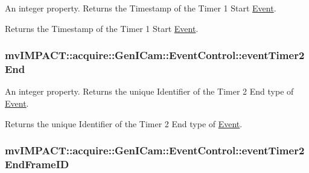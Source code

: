 An integer property. Returns the Timestamp of the Timer 1 Start \hyperlink{classmv_i_m_p_a_c_t_1_1acquire_1_1_event}{Event}. 

Returns the Timestamp of the Timer 1 Start \hyperlink{classmv_i_m_p_a_c_t_1_1acquire_1_1_event}{Event}. \hypertarget{classmv_i_m_p_a_c_t_1_1acquire_1_1_gen_i_cam_1_1_event_control_abdfd944bae55c90b5fda22fc40b0ecbf}{
\subsubsection[{event\+Timer2\+End}]{ mv\+I\+M\+P\+A\+C\+T\+::acquire\+::\+Gen\+I\+Cam\+::\+Event\+Control\+::event\+Timer2\+End}}\label{classmv_i_m_p_a_c_t_1_1acquire_1_1_gen_i_cam_1_1_event_control_abdfd944bae55c90b5fda22fc40b0ecbf}


An integer property. Returns the unique Identifier of the Timer 2 End type of \hyperlink{classmv_i_m_p_a_c_t_1_1acquire_1_1_event}{Event}. 

Returns the unique Identifier of the Timer 2 End type of \hyperlink{classmv_i_m_p_a_c_t_1_1acquire_1_1_event}{Event}. \hypertarget{classmv_i_m_p_a_c_t_1_1acquire_1_1_gen_i_cam_1_1_event_control_a17f48d4a5736b1a5539c120934b76282}{
\subsubsection[{event\+Timer2\+End\+Frame\+I\+D}]{ mv\+I\+M\+P\+A\+C\+T\+::acquire\+::\+Gen\+I\+Cam\+::\+Event\+Control\+::event\+Timer2\+End\+Frame\+I\+D}}\label{classmv_i_m_p_a_c_t_1_1acquire_1_1_gen_i_cam_1_1_event_control_a17f48d4a5736b1a5539c120934b76282}


